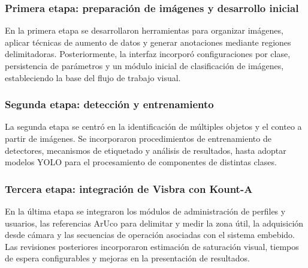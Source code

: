 \subsubsection{Primera etapa: preparación de imágenes y desarrollo inicial}
En la primera etapa se desarrollaron herramientas para organizar imágenes, aplicar técnicas de aumento de datos y generar anotaciones mediante regiones delimitadoras. Posteriormente, la interfaz incorporó configuraciones por clase, persistencia de parámetros y un módulo inicial de clasificación de imágenes, estableciendo la base del flujo de trabajo visual.

\subsubsection{Segunda etapa: detección y entrenamiento}
La segunda etapa se centró en la identificación de múltiples objetos y el conteo a partir de imágenes. Se incorporaron procedimientos de entrenamiento de detectores, mecanismos de etiquetado y análisis de resultados, hasta adoptar modelos YOLO para el procesamiento de componentes de distintas clases.

\subsubsection{Tercera etapa: integración de Visbra con Kount-A}
En la última etapa se integraron los módulos de administración de perfiles y usuarios, las referencias ArUco para delimitar y medir la zona útil, la adquisición desde cámara y las secuencias de operación asociadas con el sistema embebido. Las revisiones posteriores incorporaron estimación de saturación visual, tiempos de espera configurables y mejoras en la presentación de resultados.

